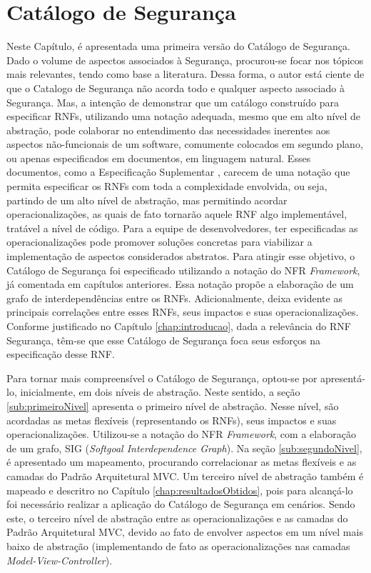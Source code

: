 \chapter{Catálogo de Segurança}
\label{chap:proposta}

Neste Capítulo, é apresentada uma primeira versão do Catálogo de Segurança. Dado o volume de aspectos associados à Segurança, procurou-se focar nos tópicos mais relevantes, tendo como base a literatura. Dessa forma, o autor está ciente de que o Catalogo de Segurança não acorda todo e qualquer aspecto associado à Segurança. Mas, a intenção de demonstrar que um catálogo construído para especificar RNFs, utilizando uma notação adequada, mesmo que em alto nível de abstração, pode colaborar no entendimento das necessidades inerentes aos aspectos não-funcionais de um software, comumente colocados em segundo plano, ou apenas especificados em documentos, em linguagem natural. Esses documentos, como a Especificação Suplementar \cite{sommerville1997requirements}, carecem de uma notação que permita especificar os RNFs com toda a complexidade envolvida, ou seja, partindo de um alto nível de abstração, mas permitindo acordar operacionalizações, as quais de fato tornarão aquele RNF algo implementável, tratável a nível de código. Para a equipe de desenvolvedores, ter especificadas as operacionalizações pode promover soluções concretas para viabilizar a implementação de aspectos considerados abstratos. Para atingir esse objetivo, o Catálogo de Segurança foi especificado utilizando a notação do NFR \textit{Framework}, já comentada em capítulos anteriores. Essa notação propõe a elaboração de um grafo de interdependências entre os RNFs. Adicionalmente, deixa evidente as principais correlações entre esses RNFs, seus impactos e suas operacionalizações. Conforme justificado no Capítulo \ref{chap:introducao}, dada a relevância do RNF Segurança, têm-se que esse Catálogo de Segurança foca seus esforços na especificação desse RNF.

Para tornar mais compreensível o Catálogo de Segurança, optou-se por apresentá-lo, inicialmente, em dois níveis de abstração. Neste sentido, a seção \ref{sub:primeiroNivel} apresenta o primeiro nível de abstração. Nesse nível, são acordadas as metas flexíveis (representando os RNFs), seus impactos e suas operacionalizações. Utilizou-se a notação do NFR \textit{Framework}, com a elaboração de um grafo, SIG (\textit{Softgoal Interdependence Graph}). Na seção \ref{sub:segundoNivel}, é apresentado um mapeamento, procurando correlacionar as metas flexíveis e as camadas do Padrão Arquitetural MVC. Um terceiro nível de abstração também é mapeado e descritro no Capítulo \ref{chap:resultadosObtidos}, pois para alcançá-lo foi necessário realizar a aplicação do Catálogo de Segurança em cenários. Sendo este, o terceiro nível de abstração entre as operacionalizações e as camadas do Padrão Arquitetural MVC, devido ao fato de envolver aspectos em um nível mais baixo de abstração (implementando de fato as operacionalizações nas camadas \textit{Model-View-Controller}).

